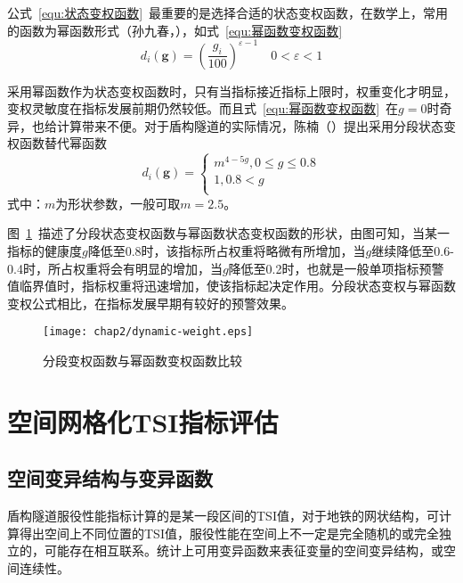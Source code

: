 公式~\ref{equ:状态变权函数}~最重要的是选择合适的状态变权函数，在数学上，常用的函数为幂函数形式（孙九春，\citeyear{孙九春2002大型桥梁综合评估系统研究}），如式~\ref{equ:幂函数变权函数}
\begin{equation}
    \label{equ:幂函数变权函数}
    {{d}_{i}}(\mathbf{g})={{(\frac{{{g}_{i}}}{100})}^{\varepsilon -1}}\quad 0<\varepsilon <1
\end{equation}

采用幂函数作为状态变权函数时，只有当指标接近指标上限时，权重变化才明显，变权灵敏度在指标发展前期仍然较低。而且式~\ref{equ:幂函数变权函数}~在$g=0$时奇异，也给计算带来不便。对于盾构隧道的实际情况，陈楠（\citeyear{陈楠2017考虑发展趋势与指标关联的隧道结构健康评估方法研究}）提出采用分段状态变权函数替代幂函数
\begin{equation}
    \label{equ:分段状态变权函数}
    {{d}_{i}}(\mathbf{g})=\left\{ \begin{array}{*{35}{l}}
   {{m}^{4-5g}},0\le g\le 0.8  \\
   1,0.8 < g  \\
\end{array} \right.
\end{equation}
式中：$m$为形状参数，一般可取$m=2.5$。

图~\ref{fig:分段变权函数与幂函数变权函数比较}~描述了分段状态变权函数与幂函数状态变权函数的形状，由图可知，当某一指标的健康度$g$降低至0.8时，该指标所占权重将略微有所增加，当$g$继续降低至0.6-0.4时，所占权重将会有明显的增加，当$g$降低至0.2时，也就是一般单项指标预警值临界值时，指标权重将迅速增加，使该指标起决定作用。分段状态变权与幂函数变权公式相比，在指标发展早期有较好的预警效果。

\begin{figure}[htbp]
    \centering
    \texttt{[image: chap2/dynamic-weight.eps]}
    \caption{分段变权函数与幂函数变权函数比较}
    \label{fig:分段变权函数与幂函数变权函数比较}
\end{figure}

\section{空间网格化TSI指标评估}

\subsection{空间变异结构与变异函数}

盾构隧道服役性能指标计算的是某一段区间的TSI值，对于地铁的网状结构，可计算得出空间上不同位置的TSI值，服役性能在空间上不一定是完全随机的或完全独立的，可能存在相互联系。统计上可用变异函数来表征变量的空间变异结构，或空间连续性。

